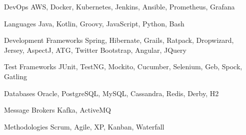 
\begin{cvskills}

  \cvskill
    {DevOps} %
    {AWS, Docker, Kubernetes, Jenkins, Ansible, Prometheus, Grafana} %

  \cvskill
    {Languages} %
    {Java, Kotlin, Groovy, JavaScript, Python, Bash} %
    
  \cvskill
    {Development Frameworks} %
    {Spring, Hibernate, Grails, Ratpack, Dropwizard, Jersey, AspectJ, ATG, Twitter Bootstrap, Angular, JQuery} %
    
  \cvskill
    {Test Frameworks} %
    {JUnit, TestNG, Mockito, Cucumber, Selenium, Geb, Spock, Gatling} %

  \cvskill
    {Databases} %
    {Oracle, PostgreSQL, MySQL, Cassandra, Redis, Derby, H2} %

  \cvskill
    {Message Brokers} %
    {Kafka, ActiveMQ} %
    
  \cvskill
    {Methodologies} %
    {Scrum, Agile, XP, Kanban, Waterfall} %

\end{cvskills}
